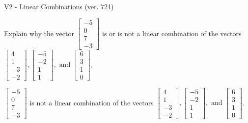 \begin{exercise}
  \begin{exerciseTitle}V2 - Linear Combinations (ver. 721)\end{exerciseTitle}
  \begin{exerciseStatement}
    Explain why the vector \(\left[\begin{array}{c}
-5 \\
0 \\
7 \\
-3
\end{array}\right]\)  is or is not a linear 
	combination of the vectors \(\left[\begin{array}{c}
4 \\
1 \\
-3 \\
-2
\end{array}\right] , \left[\begin{array}{c}
-5 \\
-2 \\
1 \\
1
\end{array}\right] , \text{ and } \left[\begin{array}{c}
6 \\
3 \\
1 \\
0
\end{array}\right]\).
	


  \end{exerciseStatement}
  \begin{exerciseAnswer}
   \(\left[\begin{array}{c}
-5 \\
0 \\
7 \\
-3
\end{array}\right]\) 
  	 is not  
	a linear combination of the vectors \(\left[\begin{array}{c}
4 \\
1 \\
-3 \\
-2
\end{array}\right] , \left[\begin{array}{c}
-5 \\
-2 \\
1 \\
1
\end{array}\right] , \text{ and } \left[\begin{array}{c}
6 \\
3 \\
1 \\
0
\end{array}\right]\).

	
  


  \end{exerciseAnswer}
\end{exercise}